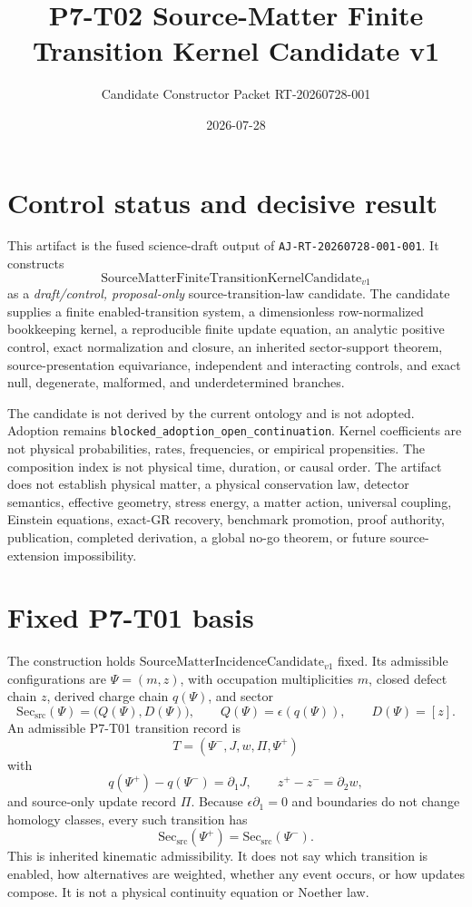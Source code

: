 \documentclass[11pt]{article}
\title{P7-T02 Source-Matter Finite Transition Kernel Candidate v1}
\author{Candidate Constructor Packet RT-20260728-001}
\date{2026-07-28}
\newcommand{\Sect}{\mathrm{Sec}_{\mathrm{src}}}
\begin{document}
\maketitle

\section{Control status and decisive result}

This artifact is the fused science-draft output of
\texttt{AJ-RT-20260728-001-001}. It constructs
\[
  \mathrm{SourceMatterFiniteTransitionKernelCandidate}_{v1}
\]
as a \emph{draft/control, proposal-only} source-transition-law candidate.
The candidate supplies a finite enabled-transition system, a dimensionless
row-normalized bookkeeping kernel, a reproducible finite update equation, an
analytic positive control, exact normalization and closure, an inherited
sector-support theorem, source-presentation equivariance, independent and
interacting controls, and exact null, degenerate, malformed, and
underdetermined branches.

The candidate is not derived by the current ontology and is not adopted.
Adoption remains
\texttt{blocked\_adoption\_open\_continuation}. Kernel coefficients are not
physical probabilities, rates, frequencies, or empirical propensities. The
composition index is not physical time, duration, or causal order. The
artifact does not establish physical matter, a physical conservation law,
detector semantics, effective geometry, stress energy, a matter action,
universal coupling, Einstein equations, exact-GR recovery, benchmark
promotion, proof authority, publication, completed derivation, a global
no-go theorem, or future source-extension impossibility.

\section{Fixed P7-T01 basis}

The construction holds
\(\mathrm{SourceMatterIncidenceCandidate}_{v1}\) fixed. Its admissible
configurations are \(\Psi=(m,z)\), with occupation multiplicities \(m\),
closed defect chain \(z\), derived charge chain \(q(\Psi)\), and sector
\[
  \Sect(\Psi)=\bigl(Q(\Psi),D(\Psi)\bigr),
  \qquad
  Q(\Psi)=\epsilon(q(\Psi)),
  \qquad
  D(\Psi)=[z].
\]
An admissible P7-T01 transition record is
\[
  T=(\Psi^-,J,w,\Pi,\Psi^+)
\]
with
\begin{equation}
  q(\Psi^+)-q(\Psi^-)=\partial_1J,
  \qquad
  z^+-z^-=\partial_2w,
  \label{eq:p7t01-constraints}
\end{equation}
and source-only update record \(\Pi\). Because
\(\epsilon\partial_1=0\) and boundaries do not change homology classes,
every such transition has
\[
  \Sect(\Psi^+)=\Sect(\Psi^-).
\]
This is inherited kinematic admissibility. It does not say which transition
is enabled, how alternatives are weighted, whether any event occurs, or how
updates compose. It is not a physical continuity equation or Noether law.
\end{document}
